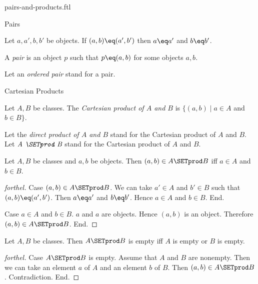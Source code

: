 \documentclass{naproche-library}
\begin{document}
\begin{smodule}[title=Ordered Pairs and Cartesian Products]{pairs-and-products.ftl}

\begin{sfragment}{Pairs}
  \begin{axiom}[forthel,id=FOUNDATIONS_04_8464577431863296]
    Let $a, a', b, b'$ be objects.
    If $(a, b) \eq (a', b')$ then $a \eq a'$ and $b \eq b'$.
  \end{axiom}

  \begin{definition}[forthel,id=FOUNDATIONS_04_4782386822774784]
    A \emph{pair} is an object $p$ such that $p \eq (a, b)$ for some objects $a, b$.

    Let an \emph{ordered pair} stand for a pair.
  \end{definition}
\end{sfragment}

\begin{sfragment}{Cartesian Products}
  \begin{definition}[forthel,id=FOUNDATIONS_04_2877806274936832]
    Let $A, B$ be classes.
    The \emph{Cartesian product of $A$ and $B$} is $\{ (a, b) \mid a \in A$ and $b \in B \}$.

    Let the \emph{direct product of $A$ and $B$} stand for  the Cartesian product of $A$ and $B$.
    Let $\emph{A \SETprod B}$ stand for the Cartesian product of $A$ and $B$.
  \end{definition}

  \begin{proposition}[forthel,id=FOUNDATIONS_04_1581118511906816]
    Let $A, B$ be classes and $a, b$ be objects.
    Then $(a, b) \in A \SETprod B$ iff $a \in A$ and $b \in B$.
  \end{proposition}
  \begin{proof}[forthel]
    Case $(a, b) \in A \SETprod B$.
      We can take $a' \in A$ and $b' \in B$ such that $(a, b) \eq (a', b')$.
      Then $a \eq a'$ and $b \eq b'$.
      Hence $a \in A$ and $b \in B$.
    End.

    Case $a \in A$ and $b \in B$.
      $a$ and $a$ are objects.
      Hence $(a, b)$ is an object.
      Therefore $(a, b) \in A \SETprod B$.
    End.
  \end{proof}

  \begin{proposition}[forthel,id=FOUNDATIONS_04_2198552029691904]
    Let $A, B$ be classes.
    Then $A \SETprod B$ is empty iff $A$ is empty or $B$ is empty.
  \end{proposition}
  \begin{proof}[forthel]
    Case $A \SETprod B$ is empty.
      Assume that $A$ and $B$ are nonempty.
      Then we can take an element $a$ of $A$ and an element $b$ of $B$.
      Then $(a, b) \in A \SETprod B$.
      Contradiction.
    End.


\end{proof}
\end{sfragment}
\end{smodule}
\end{document}
